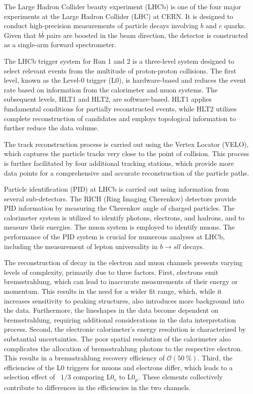 The Large Hadron Collider beauty experiment (LHCb) is one of the four major experiments 
at the Large Hadron Collider (LHC) at CERN. It is designed to conduct high-precision 
measurements of particle decays involving $b$ and $c$ quarks. Given that $b\bar{b}$ pairs 
are boosted in the beam direction, the detector is constructed as a single-arm forward 
spectrometer. \cite{LHCb}

The LHCb trigger system for Run 1 and 2 is a three-level system designed to select relevant events from 
the multitude of proton-proton collisions. The first level, known as the Level-0 trigger 
(L0), is hardware-based and reduces the event rate based on information from the calorimeter 
and muon systems. The subsequent levels, HLT1 and HLT2, are software-based. HLT1 applies 
fundamental conditions for partially reconstructed events, while HLT2 utilizes complete 
reconstruction of candidates and employs topological information to further reduce the 
data volume. \cite{trigger}

The track reconstruction process is carried out using the Vertex Locator (VELO), which 
captures the particle tracks very close to the point of collision. This process is further 
facilitated by four additional tracking stations, which provide more data points for a 
comprehensive and accurate reconstruction of the particle paths.

Particle identification (PID) at LHCb is carried out using information from several 
sub-detectors. The RICH (Ring Imaging Cherenkov) detectors provide PID information by 
measuring the Cherenkov angle of charged particles. The calorimeter system is utilized 
to identify photons, electrons, and hadrons, and to measure their energies. The muon 
system is employed to identify muons. The performance of the PID system is crucial for 
numerous analyses at LHCb, including the measurement of lepton universality in $b\to sll$ 
decays. \cite{LHCb}

The reconstruction of decay in the electron and muon channels presents varying levels of 
complexity, primarily due to three factors. First, electrons emit bremsstrahlung, which 
can lead to inaccurate measurements of their energy or momentum. This results in the need 
for a wider fit range, which, while it increases sensitivity to peaking structures, also 
introduces more background into the data. Furthermore, the lineshapes in the data become 
dependent on bremsstrahlung, requiring additional considerations in the data interpretation 
process. Second, the electronic calorimeter's energy resolution is characterized 
by substantial uncertainties. The poor spatial resolution of the calorimeter also complicates 
the allocation of bremsstrahlung photons to the respective electron. This results in a 
bremsstrahlung recovery efficiency of $\mathcal{O}(\SI{50}{\%})$.
Third, the efficiencies of the L0 triggers for muons and electrons 
differ, which leads to a selection effect of ~$1/3$ comparing $\text{L0}_e$ to $\text{L0}_\mu$. 
These elements collectively contribute to differences in the efficiencies in the two channels. 

